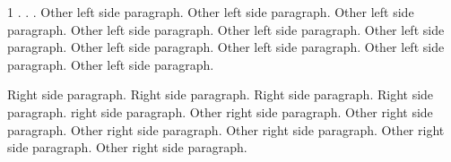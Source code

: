 \documentclass{article}
\begin{document}
\makeatletter

\makeatother

\begin{pages}
    \begin{Leftside}
        \beginnumbering
            \pstart
                  1 
                  {%
                    }%
                    .   .   .
            \pend
            \pstart
                Other left side paragraph.  Other left side paragraph.  Other left side paragraph.  Other left side paragraph.  Other left side paragraph.  Other left side paragraph.  Other left side paragraph.  Other left side paragraph.  Other left side paragraph.  Other left side paragraph.
            \pend
        \endnumbering
    \end{Leftside}
    \begin{Rightside}
        \beginnumbering
            \pstart
                 Right side paragraph. Right side paragraph. Right side paragraph. Right side paragraph.
            \pend
            \pstart
                 right side paragraph. Other right side paragraph. Other right side paragraph. Other right side paragraph. Other right side paragraph. Other right side paragraph. Other right side paragraph.
            \pend
        \endnumbering
    \end{Rightside}

\end{pages} 
\Pages
\end{document}
